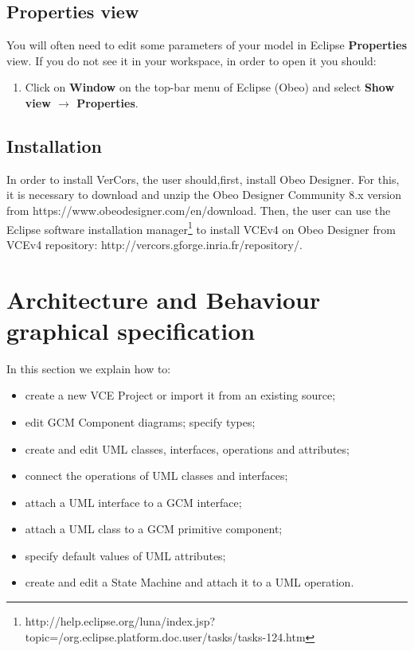 \documentclass[12pt]{article}
\begin{document}
\subsection{Properties view}

You will often need to edit some parameters of your model in Eclipse \textbf{Properties} view. If you do not see it in your workspace, in order to open it you should:

\begin{enumerate}
\item
Click on \textbf{Window} on the top-bar menu of Eclipse (Obeo) and select \textbf{Show view $\rightarrow$ Properties}.
\end{enumerate}

\subsection{Installation}

In order to install VerCors, the user should,first, install Obeo Designer. For this, it is necessary to download and unzip the Obeo Designer Community 8.x version from https://www.obeodesigner.com/en/download. Then, the user can use the Eclipse software installation manager\footnote{http://help.eclipse.org/luna/index.jsp?topic=/org.eclipse.platform.doc.user/tasks/tasks-124.htm} to install VCEv4 on Obeo Designer from VCEv4 repository: http://vercors.gforge.inria.fr/repository/.

\section{Architecture and Behaviour graphical specification}\label{sec:graph}
In this section we explain how to:
\begin{itemize}
\item
create a new VCE Project or import it from an existing source;
\item
edit GCM Component diagrams;
specify types;
\item
create and edit UML classes, interfaces, operations and attributes;
\item
connect the operations of UML classes and interfaces;
\item
attach a UML interface to a GCM interface;
\item
attach a UML class to a GCM primitive component;
\item
specify default values of UML attributes;
\item
create and edit a State Machine and attach it to a UML operation.
\end{itemize}
\end{document}
